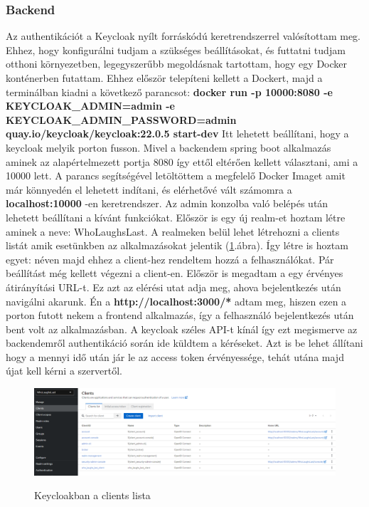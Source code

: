 \documentclass[a4paper,twoside]{article}
\begin{document}
\subsubsection{Backend}
Az authentikációt a Keycloak nyílt forráskódú keretrendszerrel valósítottam meg. Ehhez, hogy konfigurálni tudjam a 
szükséges beállításokat, és futtatni tudjam otthoni környezetben, legegyszerűbb megoldásnak tartottam, hogy egy Docker konténerben 
futattam. Ehhez először telepíteni kellett a Dockert, majd a terminálban kiadni a következő parancsot: 
\textbf{docker run -p 10000:8080 -e KEYCLOAK\_ADMIN=admin -e KEYCLOAK\_ADMIN\_PASSWORD=admin quay.io/keycloak/keycloak:22.0.5 start-dev}
Itt lehetett beállítani, hogy a keycloak melyik porton fusson. Mivel a backendem spring boot alkalmazás aminek az alapértelmezett portja 8080 így 
ettől eltérően kellett választani, ami a 10000 lett. A parancs segítségével letöltöttem a megfelelő Docker Imaget amit már könnyedén el lehetett indítani,
és elérhetővé vált számomra a \textbf{localhost:10000} -en keretrendszer. Az admin konzolba való belépés után lehetett beállítani a kívánt funkciókat. 
Először is egy új realm-et hoztam létre aminek a neve: WhoLaughsLast. A realmeken belül lehet létrehozni a clients listát amik esetünkben az alkalmazásokat jelentik (\ref{keycloak}.ábra). Így létre is hoztam egyet:  néven majd ehhez a client-hez rendeltem hozzá a felhasználókat. 
Pár beállítást még kellett végezni a client-en. Először is megadtam a egy érvényes átirányítási URL-t. Ez azt az elérési utat adja meg, ahova bejelentkezés után navigálni akarunk. Én 
a \textbf{http://localhost:3000/*} adtam meg, hiszen ezen a porton futott nekem a frontend alkalmazás, így a felhasználó bejelentkezés után bent volt az alkalmazásban. A keycloak
széles API-t kínál így ezt megismerve az backendemről authentikáció során ide küldtem a kéréseket. Azt is be lehet állítani hogy a mennyi idő után jár le az access token érvényessége, tehát utána majd újat kell kérni a szervertől. 
\begin{figure}[h]
	\caption{Keycloakban a clients lista}
	\centering
	\includegraphics[scale=0.5]{keycloak-cients}
	\label{keycloak}
\end{figure}
\newpage
\end{document}
